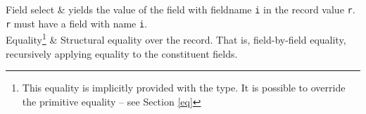 \item[Semantics of Operators:]  \mbox{}

\begin{TypeSemantics}
Field select & yields the value of the field with fieldname {\tt i}
in the record value {\tt r}. {\tt r} must have a field with name
{\tt i}. \\ \hline
Equality\footnote{This equality is implicitly provided with the type. It is possible to override the primitive equality -- see Section \ref{eq}} & Structural equality over the record. That is, field-by-field equality, recursively applying equality to the constituent fields.\\ \hline
\end{TypeSemantics}

